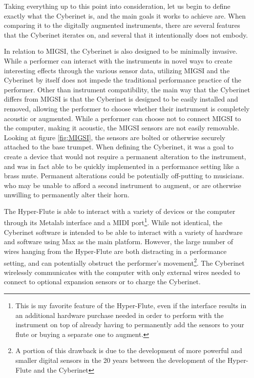 Taking everything up to this point into consideration, let us begin to define exactly what the Cyberinet is, and the main goals it works to achieve are. When comparing it to the digitally augmented instruments, there are several features that the Cyberinet iterates on, and several that it intentionally does not embody.

In relation to MIGSI, the Cyberinet is also designed to be minimally invasive. While a performer can interact with the instruments in novel ways to create interesting effects through the various sensor data, utilizing MIGSI and the Cyberinet by itself does not impede the traditional performance practice of the performer. Other than instrument compatibility, the main way that the Cyberinet differs from MIGSI is that the Cyberinet is designed to be easily installed and removed, allowing the performer to choose whether their instrument is completely acoustic or augmented. While a performer can choose not to connect MIGSI to the computer, making it acoustic, the MIGSI sensors are not easily removable. Looking at figure \ref{fig:MIGSI}, the sensors are bolted or otherwise securely attached to the base trumpet. When defining the Cyberinet, it was a goal to create a device that would not require a permanent alteration to the instrument, and was in fact able to be quickly implemented in a performance setting like a brass mute. Permanent alterations could be potentially off-putting to musicians. who may be unable to afford a second instrument to augment, or are otherwise unwilling to permanently alter their horn.

The Hyper-Flute is able to interact with a variety of devices or the computer through its Metalab interface and a MIDI port\footnote{This is my favorite feature of the Hyper-Flute, even if the interface results in an additional hardware purchase needed in order to perform with the instrument on top of already having to permanently add the sensors to your flute or buying a separate one to augment.}. While not identical, the Cyberinet software is intended to be able to interact with a variety of hardware and software using Max as the main platform. However, the large number of wires hanging from the Hyper-Flute are both distracting in a performance setting, and can potentially obstruct the performer's movement\footnote{A portion of this drawback is due to the development of more powerful and smaller digital sensors in the 20 years between the development of the Hyper-Flute and the Cyberinet}. The Cyberinet wirelessly communicates with the computer with only external wires needed to connect to optional expansion sensors or to charge the Cyberinet.


